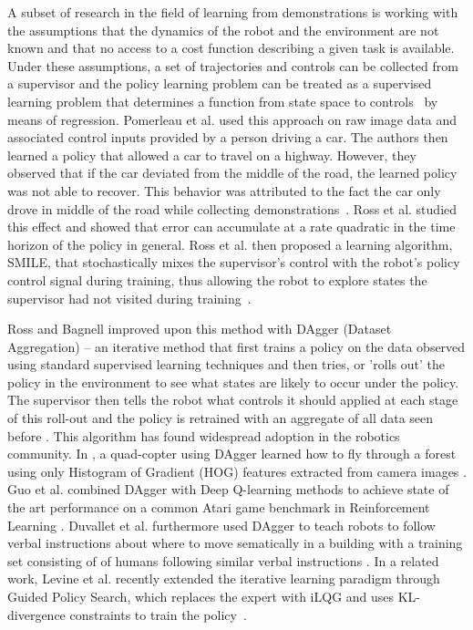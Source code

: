 \documentclass[10pt, conference]{ieeeconf}      %
\begin{document}
A subset of research in the field of learning from demonstrations is working with the assumptions that the dynamics of
the robot and the environment are not known and that no access to a cost function describing a given task is available.
Under these assumptions, a set of trajectories and controls can be collected from a supervisor and the policy learning
problem can be treated as a supervised learning problem that determines a function from state space to
controls~\cite{argall2009survey} by means of regression. Pomerleau et al. used this approach on raw image data and
associated control inputs provided by a person driving a car. The authors then learned a policy that allowed a car to
travel on a highway. However, they observed that if the car deviated from the middle of the road, the learned policy was
not able to recover. This behavior was attributed to the fact the car only drove in middle of the road while collecting
demonstrations~\cite{pomerleau1989alvinn}. Ross et al. studied this effect and showed that error can accumulate at a
rate quadratic in the time horizon of the policy in general. Ross et al. then proposed a learning algorithm, SMILE, that
stochastically mixes the supervisor's control with the robot's policy control signal during training, thus allowing the
robot to explore states the supervisor had not visited during training~\cite{ross2010efficient}. 

Ross and Bagnell improved upon this method with DAgger (Dataset Aggregation) -- an iterative method that first trains a
policy on the data observed using standard supervised learning techniques and then tries, or 'rolls out' the policy in
the environment to see what states are likely to occur under the policy. The supervisor then tells the robot what
controls it should applied at each stage of this roll-out and the policy is retrained with an aggregate of all data seen
before \cite{ross2010reduction}. This algorithm has found widespread adoption in the robotics community. In
\cite{ross2013learning}, a quad-copter using DAgger learned how to fly through a forest using only Histogram of Gradient
(HOG) features extracted from camera images \cite{ross2013learning}. Guo et al. combined DAgger with Deep Q-learning
methods to achieve state of the art performance on a common Atari game benchmark in Reinforcement Learning
\cite{NIPS2014_5421}. Duvallet et al. furthermore used DAgger to teach robots to follow verbal instructions about where
to move sematically in a building with a training set consisting of of humans following similar verbal instructions
\cite{duvallet2013imitation}. In a related work, Levine et al. recently extended the iterative learning paradigm through Guided Policy
Search, which replaces the expert with iLQG and uses KL-divergence constraints to train the policy~\cite{levine2015end}.  
\end{document}
